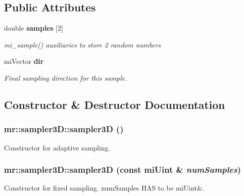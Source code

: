 \subsection*{Public Attributes}
\begin{CompactItemize}
\item 
double {\bf samples} [2]
\begin{CompactList}\small\item\em mi\_\-sample() auxiliaries to store 2 random numbers \item\end{CompactList}\item 
mi\-Vector {\bf dir}
\begin{CompactList}\small\item\em Final sampling direction for this sample. \item\end{CompactList}\end{CompactItemize}


\subsection{Constructor \& Destructor Documentation}
\subsubsection{\setlength{\rightskip}{0pt plus 5cm}mr::sampler3D::sampler3D ()\hspace{0.3cm}{\tt  [inline]}}\label{structmr_1_1sampler3D_a0}


Constructor for adaptive sampling. 

\subsubsection{\setlength{\rightskip}{0pt plus 5cm}mr::sampler3D::sampler3D (const mi\-Uint \& {\em num\-Samples})\hspace{0.3cm}{\tt  [inline]}}\label{structmr_1_1sampler3D_a1}


Constructor for fixed sampling. num\-Samples HAS to be mi\-Uint\&. 

